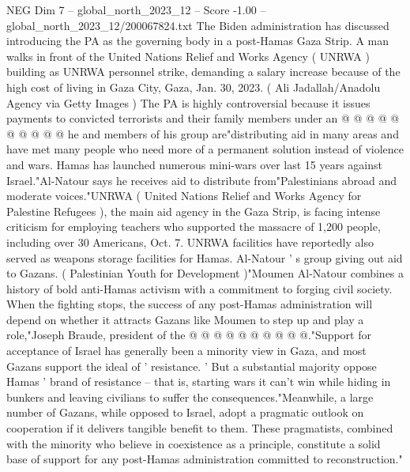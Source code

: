 \begin{textsample}{NEG Dim 7 – global\_north\_2023\_12 – Score -1.00 – global\_north\_2023\_12/200067824.txt}
The Biden administration has discussed introducing the PA as the governing body in a post-Hamas Gaza Strip.
A man walks in front of the United Nations Relief and Works Agency ( UNRWA ) building as UNRWA personnel strike, demanding a salary increase because of the high cost of living in Gaza City, Gaza, Jan. 30, 2023. ( Ali Jadallah/Anadolu Agency via Getty Images ) The PA is highly controversial because it issues payments to convicted terrorists and their family members under an @ @ @ @ @ @ @ @ @ @ he and members of his group are"distributing aid in many areas and have met many people who need more of a permanent solution instead of violence and wars.
Hamas has launched numerous mini-wars over last 15 years against Israel."Al-Natour says he receives aid to distribute from"Palestinians abroad and moderate voices."UNRWA ( United Nations Relief and Works Agency for Palestine Refugees ), the main aid agency in the Gaza Strip, is facing intense criticism for employing teachers who supported the massacre of 1,200 people, including over 30 Americans, Oct. 7.
UNRWA facilities have reportedly also served as weapons storage facilities for Hamas.
Al-Natour ' s group giving out aid to Gazans. ( Palestinian Youth for Development )"Moumen Al-Natour combines a history of bold anti-Hamas activism with a commitment to forging civil society.
When the fighting stops, the success of any post-Hamas administration will depend on whether it attracts Gazans like Moumen to step up and play a role,"Joseph Braude, president of the @ @ @ @ @ @ @ @ @ @."Support for acceptance of Israel has generally been a minority view in Gaza, and most Gazans support the ideal of ' resistance. ' But a substantial majority oppose Hamas ' brand of resistance -- that is, starting wars it can't win while hiding in bunkers and leaving civilians to suffer the consequences."Meanwhile, a large number of Gazans, while opposed to Israel, adopt a pragmatic outlook on cooperation if it delivers tangible benefit to them.
These pragmatists, combined with the minority who believe in coexistence as a principle, constitute a solid base of support for any post-Hamas administration committed to reconstruction."

\end{textsample}
